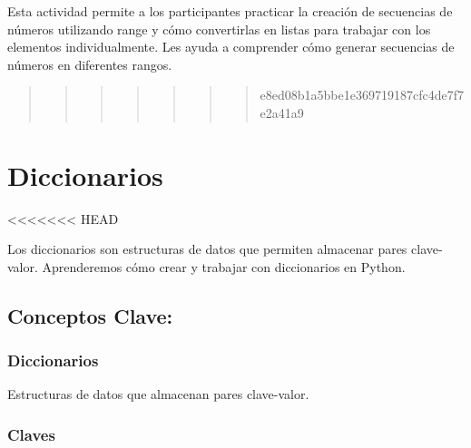 \documentclass[
  a4paper,
  onepage,
  openany]{scrreprt}
\begin{document}
Esta actividad permite a los participantes practicar la creación de
secuencias de números utilizando range y cómo convertirlas en listas
para trabajar con los elementos individualmente. Les ayuda a comprender
cómo generar secuencias de números en diferentes rangos.

\begin{quote}
\begin{quote}
\begin{quote}
\begin{quote}
\begin{quote}
\begin{quote}
\begin{quote}
e8ed08b1a5bbe1e369719187cfc4de7f7e2a41a9
\end{quote}
\end{quote}
\end{quote}
\end{quote}
\end{quote}
\end{quote}
\end{quote}

\hypertarget{diccionarios}{%
\chapter{Diccionarios}\label{diccionarios}}

\textless\textless\textless\textless\textless\textless\textless{} HEAD

Los diccionarios son estructuras de datos que permiten almacenar pares
clave-valor. Aprenderemos cómo crear y trabajar con diccionarios en
Python.

\hypertarget{conceptos-clave-24}{%
\section{Conceptos Clave:}\label{conceptos-clave-24}}

\hypertarget{diccionarios-1}{%
\subsection{Diccionarios}\label{diccionarios-1}}

Estructuras de datos que almacenan pares clave-valor.

\hypertarget{claves}{%
\subsection{Claves}\label{claves}}
\end{document}
